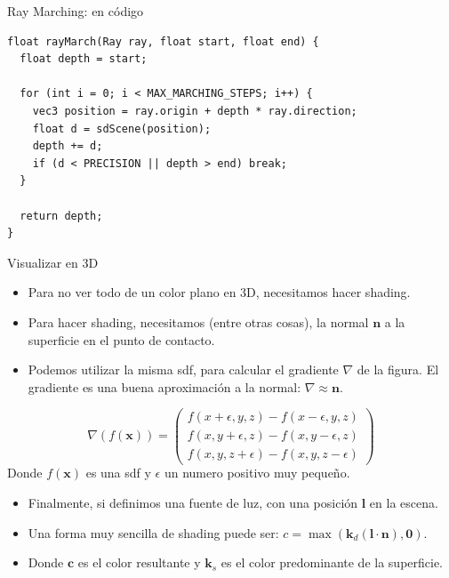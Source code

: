 \begin{frame}[fragile]{Ray Marching: en código}
\begin{listing}
\begin{verbatim}
float rayMarch(Ray ray, float start, float end) {
  float depth = start;

  for (int i = 0; i < MAX_MARCHING_STEPS; i++) {
    vec3 position = ray.origin + depth * ray.direction;
    float d = sdScene(position);
    depth += d;
    if (d < PRECISION || depth > end) break;
  }

  return depth;
}
\end{verbatim}
\end{listing}

\end{frame}

\begin{frame}{Visualizar en 3D}
\begin{itemize}
    \item Para no ver todo de un color plano en 3D, necesitamos hacer shading.
    \item Para hacer shading, necesitamos (entre otras cosas), la normal $\mathbf{n}$ a la superficie en el punto de contacto.
    \item Podemos utilizar la misma sdf, para calcular el gradiente $\nabla$ de la figura. El gradiente es una buena aproximación a la normal: $\nabla \approx \mathbf{n}$.
\end{itemize}
$$\nabla (f(\mathbf{x})) = \begin{pmatrix}
f(x + \epsilon, y, z) - f(x - \epsilon, y, z)\\
f(x, y + \epsilon, z) - f(x, y - \epsilon, z)\\
f(x, y, z + \epsilon) - f(x, y, z - \epsilon)
\end{pmatrix}$$
Donde $f(\mathbf{x})$ es una sdf y $\epsilon$ un numero positivo muy pequeño.
\begin{itemize}
    \item Finalmente, si definimos una fuente de luz, con una posición $\mathbf{l}$ en la escena.
    \item Una forma muy sencilla de shading puede ser: $c = \max(\mathbf{k}_d (\mathbf{l} \cdot \mathbf{n}), \mathbf{0})$.
    \item Donde $\mathbf{c}$ es el color resultante y $\mathbf{k}_s$ es el color predominante de la superficie.
\end{itemize}
\end{frame}

